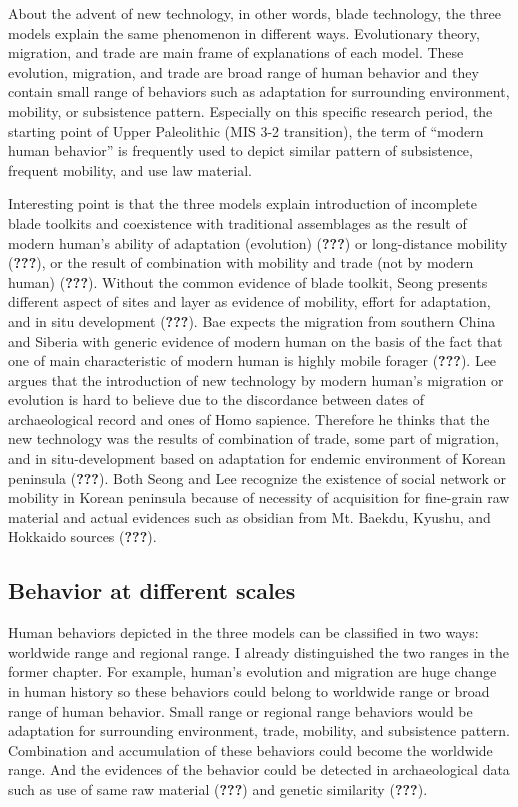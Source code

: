 \documentclass[american,man]{apa6}
\begin{document}
About the advent of new technology, in other words, blade technology,
the three models explain the same phenomenon in different ways.
Evolutionary theory, migration, and trade are main frame of explanations
of each model. These evolution, migration, and trade are broad range of
human behavior and they contain small range of behaviors such as
adaptation for surrounding environment, mobility, or subsistence
pattern. Especially on this specific research period, the starting point
of Upper Paleolithic (MIS 3-2 transition), the term of \enquote{modern
human behavior} is frequently used to depict similar pattern of
subsistence, frequent mobility, and use law material.

Interesting point is that the three models explain introduction of
incomplete blade toolkits and coexistence with traditional assemblages
as the result of modern human's ability of adaptation (evolution)
({\textbf{???}}) or long-distance mobility ({\textbf{???}}), or the
result of combination with mobility and trade (not by modern human)
({\textbf{???}}). Without the common evidence of blade toolkit, Seong
presents different aspect of sites and layer as evidence of mobility,
effort for adaptation, and in situ development ({\textbf{???}}). Bae
expects the migration from southern China and Siberia with generic
evidence of modern human on the basis of the fact that one of main
characteristic of modern human is highly mobile forager
({\textbf{???}}). Lee argues that the introduction of new technology by
modern human's migration or evolution is hard to believe due to the
discordance between dates of archaeological record and ones of Homo
sapience. Therefore he thinks that the new technology was the results of
combination of trade, some part of migration, and in situ-development
based on adaptation for endemic environment of Korean peninsula
({\textbf{???}}). Both Seong and Lee recognize the existence of social
network or mobility in Korean peninsula because of necessity of
acquisition for fine-grain raw material and actual evidences such as
obsidian from Mt. Baekdu, Kyushu, and Hokkaido sources ({\textbf{???}}).

\subsection{Behavior at different
scales}\label{behavior-at-different-scales}

Human behaviors depicted in the three models can be classified in two
ways: worldwide range and regional range. I already distinguished the
two ranges in the former chapter. For example, human's evolution and
migration are huge change in human history so these behaviors could
belong to worldwide range or broad range of human behavior. Small range
or regional range behaviors would be adaptation for surrounding
environment, trade, mobility, and subsistence pattern. Combination and
accumulation of these behaviors could become the worldwide range. And
the evidences of the behavior could be detected in archaeological data
such as use of same raw material ({\textbf{???}}) and genetic similarity
({\textbf{???}}).
\end{document}
